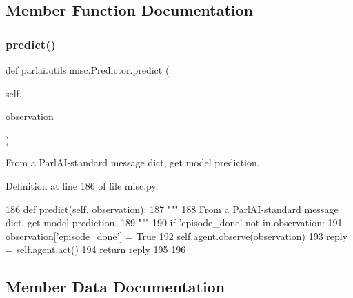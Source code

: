 \subsection{Member Function Documentation}
\mbox{\label{classparlai_1_1utils_1_1misc_1_1Predictor_a7ff8a927bca43d09d3113dad20cb2a11}} 
\subsubsection{\texorpdfstring{predict()}{predict()}}
{\footnotesize\ttfamily def parlai.\+utils.\+misc.\+Predictor.\+predict (\begin{DoxyParamCaption}\item[{}]{self,  }\item[{}]{observation }\end{DoxyParamCaption})}

\begin{DoxyVerb}From a ParlAI-standard message dict, get model prediction.
\end{DoxyVerb}
 

Definition at line 186 of file misc.\+py.


\begin{DoxyCode}
186     \textcolor{keyword}{def }predict(self, observation):
187         \textcolor{stringliteral}{"""}
188 \textcolor{stringliteral}{        From a ParlAI-standard message dict, get model prediction.}
189 \textcolor{stringliteral}{        """}
190         \textcolor{keywordflow}{if} \textcolor{stringliteral}{'episode\_done'} \textcolor{keywordflow}{not} \textcolor{keywordflow}{in} observation:
191             observation[\textcolor{stringliteral}{'episode\_done'}] = \textcolor{keyword}{True}
192         self.agent.observe(observation)
193         reply = self.agent.act()
194         \textcolor{keywordflow}{return} reply
195 
196 
\end{DoxyCode}


\subsection{Member Data Documentation}
\mbox{\label{classparlai_1_1utils_1_1misc_1_1Predictor_a0ea35fd562c6edaa6affd03006f1bd08}} 
